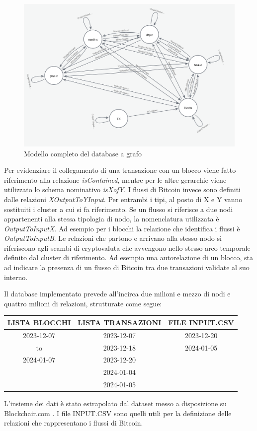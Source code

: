 \begin{figure}[H]
    \centering \includegraphics[keepaspectratio=true,scale=0.52]{Images/Modello completo.png}
    \caption{Modello completo del database a grafo}
\end{figure}
Per evidenziare il collegamento di una transazione con un blocco viene fatto riferimento alla relazione \emph{isContained}, mentre per le altre gerarchie viene utilizzato lo schema nominativo \emph{isXofY}.
I flussi di Bitcoin invece sono definiti dalle relazioni \emph{XOutputToYInput}.
Per entrambi i tipi, al posto di X e Y vanno sostituiti i cluster a cui si fa riferimento.
Se un flusso si riferisce a due nodi appartenenti alla stessa tipologia di nodo, la nomenclatura utilizzata è \emph{OutputToInputX}.
Ad esempio per i blocchi la relazione che identifica i flussi è \emph{OutputToInputB}.
Le relazioni che partono e arrivano alla stesso nodo si riferiscono agli scambi di cryptovaluta che avvengono nello stesso arco temporale definito dal cluster di riferimento.
Ad esempio una autorelazione di un blocco, sta ad indicare la presenza di un flusso di Bitcoin tra due transazioni validate al suo interno.

Il database implementato prevede all'incirca due milioni e mezzo di nodi e quattro milioni di relazioni, strutturate come segue:



\begin{center}
\begin{tabular}{|c|c|c|}
\hline
 LISTA BLOCCHI & LISTA TRANSAZIONI & FILE INPUT.CSV \\ 
 \hline
 2023-12-07 & 2023-12-07 & 2023-12-20 \\ 
  to & 2023-12-18 & 2024-01-05 \\
  2024-01-07 & 2023-12-20 & \\
   & 2024-01-04 & \\
   & 2024-01-05 & \\
 \hline
\end{tabular}

\end{center}
\thispagestyle{mystyle}
L'insieme dei dati è stato estrapolato dal dataset messo a disposizione su Blockchair.com \cite{blockchair}. I file INPUT.CSV sono quelli utili per la definizione delle relazioni che rappresentano i flussi di Bitcoin.

